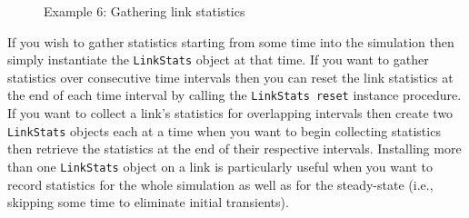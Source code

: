 \documentclass[11pt]{article}
\begin{document}
\begin{figure}[ht]
\begin{center}
\end{center}
\caption{Example 6: Gathering link statistics}\label{Ex6Figure}
\end{figure}


If you wish to gather statistics starting from some time into the
simulation then simply instantiate the \verb|LinkStats| object at that
time.  If you want to gather statistics over consecutive time intervals
then you can reset the link statistics at the end of each time interval by
calling the \verb|LinkStats reset| instance procedure.  If you want to
collect a link's statistics for overlapping intervals then create two
\verb|LinkStats| objects each at a time when you want to begin
collecting statistics then retrieve the statistics at the end
of their respective intervals.  Installing more than one
\verb|LinkStats| object on a link is particularly useful when you 
want to record statistics for the whole simulation as well as 
for the steady-state (i.e., skipping some time to eliminate 
initial transients).
\end{document}
